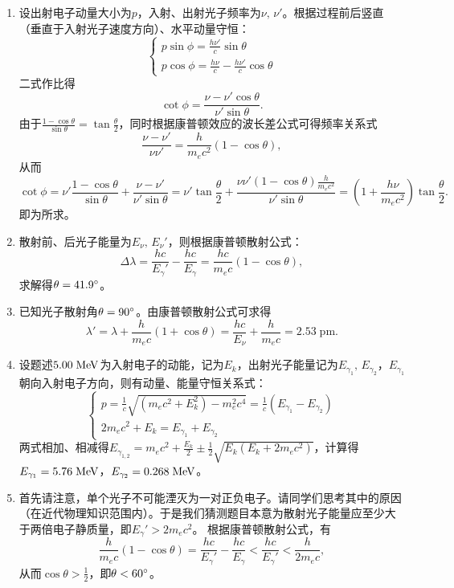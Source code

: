 \begin{enumerate}[label=1.\arabic*, leftmargin=-0.5mm]
\item
设出射电子动量大小为$p$，入射、出射光子频率为$\nu,\,\nu'$。根据过程前后竖直（垂直于入射光子速度方向）、水平动量守恒：
\[
\begin{cases}
p\sin\phi = \frac{h\nu'}{c}\sin\theta \\
p\cos\phi = \frac{h\nu}{c}-\frac{h\nu'}{c}\cos\theta
\end{cases}
\]
二式作比得
\[\cot\phi = \frac{\nu-\nu'\cos\theta}{\nu'\sin\theta}.\]
由于$\frac{1-\cos\theta}{\sin\theta} = \tan\frac{\theta}{2}$，同时根据康普顿效应的波长差公式可得频率关系式
\[\frac{\nu-\nu'}{\nu\nu'} = \frac{h}{m_e c^2}(1-\cos\theta),\]
从而
\[\cot\phi = \nu'\frac{1-\cos\theta}{\sin\theta}+\frac{\nu-\nu'}{\nu'\sin\theta} = \nu'\tan\frac{\theta}{2}+\frac{\nu\nu'(1-\cos\theta)\frac{h}{m_e c^2}}{\nu'\sin\theta} = (1+\frac{h\nu}{m_e c^2})\tan\frac{\theta}{2}.\]
即为所求。

\item
散射前、后光子能量为$E_\nu,\,E_\nu'$，则根据康普顿散射公式：
\[\Delta \lambda = \frac{hc}{E_\gamma'}-\frac{hc}{E_\gamma} = \frac{hc}{m_e c}(1-\cos\theta),\]
求解得$\theta=41.9^\circ$。

\item
已知光子散射角$\theta = 90^\circ$。由康普顿散射公式可求得
\[\lambda' = \lambda+\frac{h}{m_e c}(1+\cos\theta) = \frac{hc}{E_\nu}+\frac{h}{m_e c} = 2.53\;\mathrm{pm}.\]

\item
设题述$5.00\;\mathrm{MeV}$为入射电子的动能，记为$E_k$，出射光子能量记为$E_{\gamma_1},\,E_{\gamma_2}$，$E_{\gamma_1}$朝向入射电子方向，则有动量、能量守恒关系式：
\[
\begin{cases}
p = \frac{1}{c}\sqrt{(m_e c^2 + E_k^2)-m_e^2 c^4} = \frac{1}{c}(E_{\gamma_1}-E_{\gamma_2})
\\
2m_e c^2 + E_k = E_{\gamma_1}+E_{\gamma_2}
\end{cases}
\]
两式相加、相减得$E_{\gamma_{1,2}} = m_e c^2+\frac{E_k}{2} \pm \frac{1}{2}\sqrt{E_k(E_k+2m_e c^2)}$，计算得$E_{\gamma_1}=5.76\;\mathrm{MeV}$，$E_{\gamma_2}=0.268\;\mathrm{MeV}$。

\item
{\color{red}首先请注意，单个光子不可能湮灭为一对正负电子。}请同学们思考其中的原因（在近代物理知识范围内）。于是我们猜测题目本意为散射光子能量应至少大于两倍电子静质量，即$E_\gamma'>2m_e c^2$。
根据康普顿散射公式，有
\[\frac{h}{m_e c}(1-\cos\theta) = \frac{hc}{E_\gamma'}-\frac{hc}{E_\gamma} < \frac{hc}{E_\gamma'}<\frac{h}{2m_e c},\]
从而$\cos\theta>\frac{1}{2}$，即$\theta<60^\circ$。


\end{enumerate}
